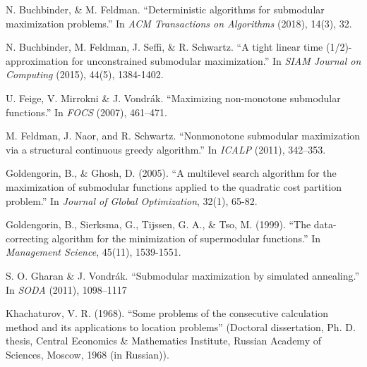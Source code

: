 \documentclass{article}
\begin{document}

\begin{thebibliography}{99}
N. Buchbinder, \& M. Feldman. ``Deterministic algorithms for submodular maximization problems.'' In \emph{ACM Transactions on Algorithms} (2018), 14(3), 32.

N. Buchbinder, M. Feldman, J. Seffi, \& R. Schwartz. ``A tight linear time (1/2)-approximation for unconstrained submodular maximization.'' In \emph{SIAM Journal on Computing} (2015), 44(5), 1384-1402.

U. Feige, V. Mirrokni \& J. Vondr\'{a}k. ``Maximizing non-monotone submodular functions.'' In \emph{FOCS} (2007), 461–471.

M. Feldman, J. Naor, and R. Schwartz. ``Nonmonotone submodular maximization via a structural continuous greedy algorithm.'' In \emph{ICALP} (2011), 342–353.

Goldengorin, B., \& Ghosh, D. (2005). ``A multilevel search algorithm for the maximization of submodular functions applied to the quadratic cost partition problem.'' In \emph{Journal of Global Optimization}, 32(1), 65-82.

Goldengorin, B., Sierksma, G., Tijssen, G. A., \& Tso, M. (1999). ``The data-correcting algorithm for the minimization of supermodular functions.'' In \emph{Management Science}, 45(11), 1539-1551.

S. O. Gharan \& J. Vondr\'{a}k. ``Submodular maximization by simulated annealing.'' In \emph{SODA} (2011), 1098–1117

Khachaturov, V. R. (1968). ``Some problems of the consecutive calculation method and its applications to location problems'' (Doctoral dissertation, Ph. D. thesis, Central Economics \& Mathematics Institute, Russian Academy of Sciences, Moscow, 1968 (in Russian)).
\end{thebibliography}
\end{document}
